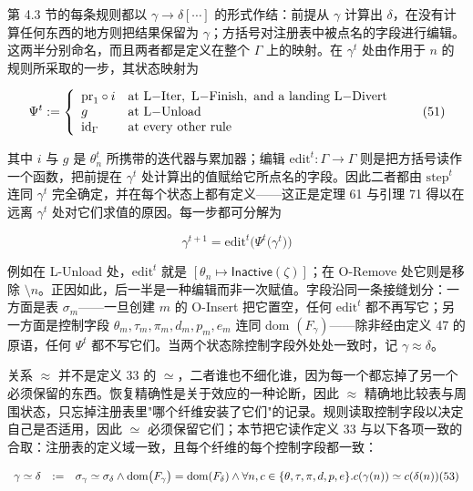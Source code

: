 \documentclass[
  10
]{article}
\begin{document}
第 4.3 节的每条规则都以 $\gamma \longrightarrow \delta [ \cdots ]$ 的形式作结：前提从 $\gamma$ 计算出 $\delta$，在没有计算任何东西的地方则把结果保留为 $\gamma$；方括号对注册表中被点名的字段进行编辑。这两半分别命名，而且两者都是定义在整个 $\Gamma$ 上的映射。在 $\gamma ^ { t }$ 处由作用于 $n$ 的规则所采取的一步，其状态映射为

\[
\Psi ^ { t } : = \left\{ \begin{array} { l l } { \mathrm { p r } _ { 1 } \circ i } & { \mathrm { a t ~ L \mathrm { - } I t e r , ~ L \mathrm { - } F i n i s h , ~ a n d ~ a ~ l a n d i n g ~ L \mathrm { - } D i v e r t } } \\ { g } & { \mathrm { a t ~ L \mathrm { - } U n l o a d } } \\ { \mathrm { i d } _ { \Gamma } } & { \mathrm { a t ~ e v e r y ~ o t h e r ~ r u l e } } \end{array} \right.\tag{51}
\]

其中 $i$ 与 $g$ 是 $\theta _ { n } ^ { t }$ 所携带的迭代器与累加器；编辑 $\mathrm{edit}^{t} : \Gamma \to \Gamma$ 则是把方括号读作一个函数，把前提在 $\gamma ^ { t }$ 处计算出的值赋给它所点名的字段。因此二者都由 $\mathrm{step}^{t}$ 连同 $\gamma ^ { t }$ 完全确定，并在每个状态上都有定义——这正是定理 61 与引理 71 得以在远离 $\gamma ^ { t }$ 处对它们求值的原因。每一步都可分解为

\[
\gamma ^ { t + 1 } = \mathrm { e d i t } ^ { t } \big ( \Psi ^ { t } \big ( \gamma ^ { t } \big ) \big )\tag{52}
\]

例如在 L-Unload 处，$\mathrm{edit}^{t}$ 就是 $[ \theta _ { n } \mapsto \mathsf{Inactive}(\zeta) ]$；在 O-Remove 处它则是移除 $\setminus n$。正因如此，后一半是一种编辑而非一次赋值。字段沿同一条接缝划分：一方面是表 $\sigma _ { m }$——一旦创建 $m$ 的 O-Insert 把它置空，任何 $\mathrm{edit}^{t}$ 都不再写它；另一方面是控制字段 $\theta _ { m } , \tau _ { m } , \pi _ { m } , d _ { m } , p _ { m } , e _ { m }$ 连同 dom $\left( F _ { \gamma } \right)$——除非经由定义 47 的原语，任何 $\Psi ^ { t }$ 都不写它们。当两个状态除控制字段外处处一致时，记 $\gamma \approx \delta$。

关系 $\approx$ 并不是定义 33 的 $\simeq$，二者谁也不细化谁，因为每一个都忘掉了另一个必须保留的东西。恢复精确性是关于效应的一种论断，因此 $\approx$ 精确地比较表与周围状态，只忘掉注册表里"哪个纤维安装了它们"的记录。规则读取控制字段以决定自己是否适用，因此 $\simeq$ 必须保留它们；本节把它读作定义 33 与以下各项一致的合取：注册表的定义域一致，且每个纤维的每个控制字段都一致：

\[
\begin{array} { r l r } { \gamma \simeq \delta } & { : = } & { \sigma _ { \gamma } \simeq \sigma _ { \delta } \wedge \mathrm { d o m } \big ( F _ { \gamma } \big ) = \mathrm { d o m } ( F _ { \delta } ) \wedge \forall n , c \in \{ \theta , \tau , \pi , d , p , e \} . c ( \gamma ( n ) ) \simeq c ( \delta ( n ) ) (53) } \end{array}
\]
\end{document}
